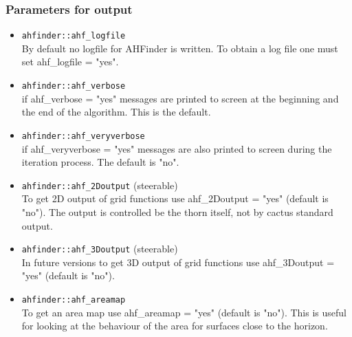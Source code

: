 \subsubsection*{Parameters for output}
\begin{itemize}
\item {\tt ahfinder::ahf\_logfile} \\
        By default no logfile for AHFinder is written. To obtain a log
        file one must set ahf\_logfile = "yes".
\item {\tt ahfinder::ahf\_verbose} \\
        if ahf\_verbose = "yes" messages are printed to screen at the
        beginning and the end of the algorithm. This is the default.
\item {\tt ahfinder::ahf\_veryverbose} \\
        if ahf\_veryverbose = "yes" messages are also printed to screen
        during the iteration process. The default is "no".
\item {\tt ahfinder::ahf\_2Doutput} (steerable) \\
        To get 2D output of grid functions use ahf\_2Doutput = "yes" (default
        is "no"). The output is controlled be the thorn itself, not by cactus
        standard output.
\item {\tt ahfinder::ahf\_3Doutput} (steerable) \\
        In future versions to get 3D output of grid functions use
        ahf\_3Doutput = "yes" (default is "no").
\item {\tt ahfinder::ahf\_areamap} \\
        To get an area map use ahf\_areamap = "yes" (default is "no").
        This is useful for looking at the behaviour of the area for
        surfaces close to the horizon.
\end{itemize}
